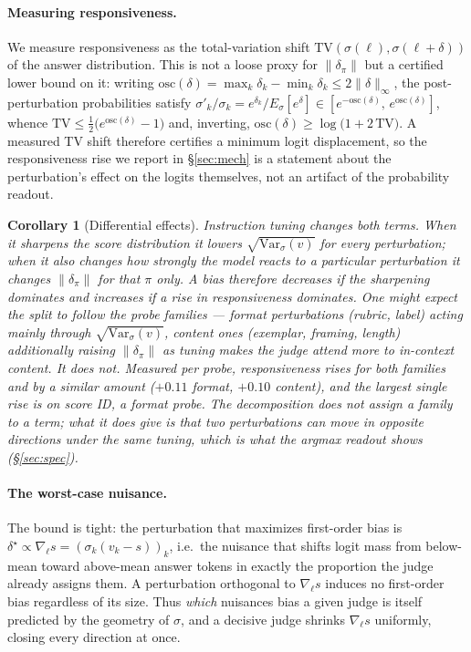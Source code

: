 \documentclass[11pt]{article}
\newtheorem{corollary}{Corollary}
\begin{document}
\paragraph{Measuring responsiveness.} We measure responsiveness as the total-variation
shift $\mathrm{TV}(\sigma(\ell),\sigma(\ell+\delta))$ of the answer distribution. This
is not a loose proxy for $\|\delta_\pi\|$ but a certified lower bound on it: writing
$\mathrm{osc}(\delta)=\max_k\delta_k-\min_k\delta_k \le 2\|\delta\|_\infty$, the
post-perturbation probabilities satisfy $\sigma'_k/\sigma_k = e^{\delta_k}/E_\sigma[e^{\delta}]
\in [e^{-\mathrm{osc}(\delta)},\, e^{\mathrm{osc}(\delta)}]$, whence
$\mathrm{TV} \le \tfrac{1}{2}\big(e^{\mathrm{osc}(\delta)}-1\big)$ and, inverting,
$\mathrm{osc}(\delta) \ge \log\!\big(1+2\,\mathrm{TV}\big)$. A measured TV shift
therefore certifies a minimum logit displacement, so the responsiveness rise we report
in \S\ref{sec:mech} is a statement about the perturbation's effect on the logits
themselves, not an artifact of the probability readout.

\begin{corollary}[Differential effects]\label{cor:diff}
Instruction tuning changes both terms. When it sharpens the score distribution it
lowers $\sqrt{\mathrm{Var}_\sigma(v)}$ for \emph{every} perturbation; when it also
changes how strongly the model reacts to a particular perturbation it changes
$\|\delta_\pi\|$ for that $\pi$ only. A bias therefore \emph{decreases} if the
sharpening dominates and \emph{increases} if a rise in responsiveness dominates. One might expect the
split to follow the probe families --- format perturbations (rubric, label) acting mainly
through $\sqrt{\mathrm{Var}_\sigma(v)}$, content ones (exemplar, framing, length)
additionally raising $\|\delta_\pi\|$ as tuning makes the judge attend more to
in-context content. It does not. Measured per probe, responsiveness rises for both
families and by a similar amount ($+0.11$ format, $+0.10$ content), and the largest
single rise is on score ID, a format probe. The decomposition does not assign a family
to a term; what it does give is that two perturbations can move in opposite directions
under the same tuning, which is what the argmax readout shows
(\S\ref{sec:spec}).
\end{corollary}

\paragraph{The worst-case nuisance.} The bound is tight: the perturbation that maximizes
first-order bias is $\delta^\star \propto \nabla_\ell s = (\sigma_k(v_k-s))_k$, i.e.\ the
nuisance that shifts logit mass from below-mean toward above-mean answer tokens in
exactly the proportion the judge already assigns them. A perturbation orthogonal to
$\nabla_\ell s$ induces no first-order bias regardless of its size. Thus \emph{which}
nuisances bias a given judge is itself predicted by the geometry of $\sigma$, and a
decisive judge shrinks $\nabla_\ell s$ uniformly, closing every direction at once.
\end{document}
